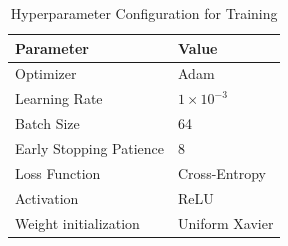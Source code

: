 \begin{table}[h]
\centering
\caption{Hyperparameter Configuration for Training}
\label{tab:training_params}
\begin{tabular}{ll}
\toprule
\textbf{Parameter} & \textbf{Value} \\
\midrule
Optimizer & Adam \\
Learning Rate & $1 \times 10^{-3}$ \\
Batch Size & 64 \\
Early Stopping Patience & 8 \\
Loss Function & Cross-Entropy \\
Activation & ReLU \\
Weight initialization & Uniform Xavier \\
\bottomrule
\end{tabular}
\end{table}